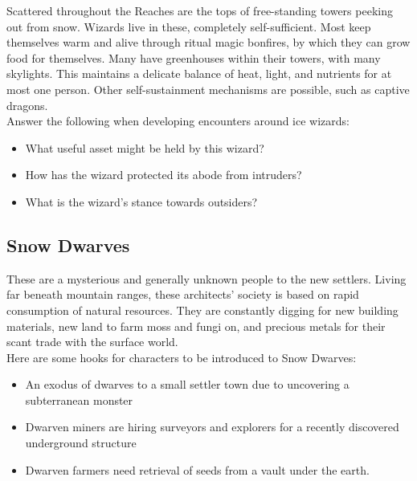 \documentclass[notitlepage]{article}
\begin{document}
\begin{multicols}{2}
  Scattered throughout the Reaches are the tops of free-standing towers peeking out from snow.
  Wizards live in these, completely self-sufficient.
  Most keep themselves warm and alive through ritual magic bonfires, by which they can grow food for themselves.
  Many have greenhouses within their towers, with many skylights.
  This maintains a delicate balance of heat, light, and nutrients for at most one person.
  Other self-sustainment mechanisms are possible, such as captive dragons. \\

  Answer the following when developing encounters around ice wizards:

  \begin{itemize}
  \item What useful asset might be held by this wizard?
  \item How has the wizard protected its abode from intruders?
  \item What is the wizard's stance towards outsiders?
  \end{itemize}

  \subsection*{Snow Dwarves}

  These are a mysterious and generally unknown people to the new settlers.
  Living far beneath mountain ranges, these architects' society is based on rapid consumption of natural resources.
  They are constantly digging for new building materials, new land to farm moss and fungi on, and precious metals for their scant trade with the surface world. \\

  Here are some hooks for characters to be introduced to Snow Dwarves:

  \begin{itemize}
  \item An exodus of dwarves to a small settler town due to uncovering a subterranean monster
  \item Dwarven miners are hiring surveyors and explorers for a recently discovered underground structure
  \item Dwarven farmers need retrieval of seeds from a vault under the earth.
  \end{itemize}


\end{multicols}
\end{document}
